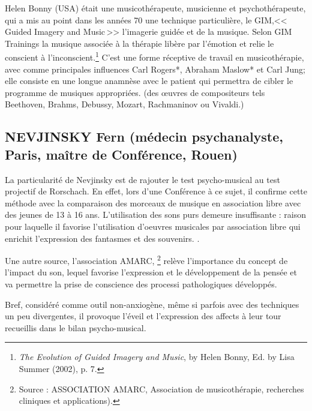 Helen Bonny (USA) était une musicothérapeute,
musicienne et psychothérapeute, qui a mis au point dans les années 70
une technique particulière, le GIM,<<\,Guided Imagery and Music\,>>
l'imagerie guidée et de la musique. Selon GIM
Trainings\autocite{gim_site} la
musique associée à la thérapie libère par l'émotion et relie le
conscient à l'inconscient.\footnote{\textsl{The Evolution of Guided Imagery and Music}, 
	by Helen Bonny, Ed. by Lisa Summer (2002), p. 7.}
 C'est une forme réceptive de travail
en musicothérapie, avec comme principales influences Carl Rogers*, Abraham Maslow* et Carl Jung; 
elle  consiste en une longue anamnèse avec le
patient qui permettra de cibler le programme de musiques appropriées. 
(des \oe uvres de compositeurs tels Beethoven, Brahms, Debussy,
Mozart, Rachmaninov ou Vivaldi.)






 \subsection{ NEVJINSKY Fern (médecin psychanalyste, 
   Paris, maître de Conférence, Rouen)}
 La particularité de Nevjinsky est de rajouter le test psycho-musical
 au test projectif de \gls{Rorschach}. En effet, lors d'une
 Conférence à ce sujet, il confirme cette méthode 
 avec la comparaison des morceaux de musique en association libre avec
 des jeunes de 13 à 16 ans. 
 L'utilisation des sons purs demeure insuffisante : raison pour
 laquelle il favorise l'utilisation d'oeuvres musicales par
 association libre qui enrichit l'expression des fantasmes et des
 souvenirs.
\autocite[Fern Nevjinsky, maître de conférences à l'Université de Rouen, musicien, psycho-analyste. 
``\textit{Comparaison des modalités de projection et d'expression au test de Rorschach et à un test psycho-musical pour des adolescents de 13 à 16 ans}''.]{nevjinsky:adolescence}.  


Une autre source, l'association AMARC, \footnote{Source : ASSOCIATION AMARC,
  Association de musicothérapie, recherches cliniques et
  applications). } relève l'importance du concept de l'impact du son,
lequel favorise l'expression et le développement de la pensée et va
permettre la prise de conscience des processi pathologiques
développés.

Bref, considéré comme outil non-anxiogène, même si parfois avec des
techniques un peu divergentes, il provoque l'éveil et l'expression
des affects à leur tour recueillis dans le bilan psycho-musical.


